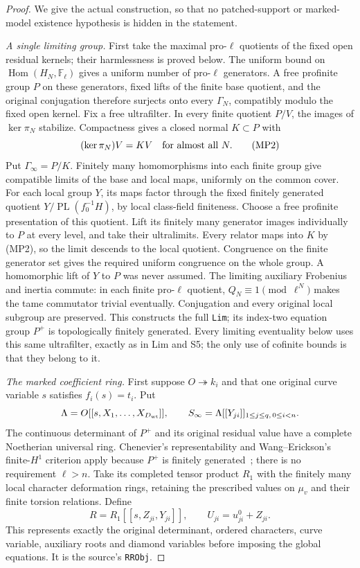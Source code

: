 \begin{proof}
We give the actual construction, so that no patched-support or
marked-model existence hypothesis is hidden in the statement.

\emph{A single limiting group.}
First take the maximal pro-$\ell$ quotients of the fixed open residual
kernels; their harmlessness is proved below.  The uniform bound on
$\operatorname{Hom}(H_N,\mathbb F_\ell)$ gives a uniform number of
pro-$\ell$ generators.  A free profinite group $P$ on these generators,
fixed lifts of the finite base quotient, and the original conjugation
therefore surjects onto every $\Gamma_N$, compatibly modulo the fixed
open kernel.  Fix a free ultrafilter.  In every finite quotient $P/V$,
the images of $\ker\pi_N$ stabilize.  Compactness gives a closed normal
$K\subset P$ with
\[
                    (\ker\pi_N)V=KV
                  \quad\hbox{for almost all }N.             \tag{MP2}
\]
Put $\Gamma_\infty=P/K$.  Finitely many homomorphisms into each finite
group give compatible limits of the base and local maps, uniformly on
the common cover.  For each local group $Y$, its maps factor through the fixed finitely
generated quotient $Y/\operatorname{PL}(f_0^{-1}H)$, by local
class-field finiteness.  Choose a free profinite presentation of this
quotient.  Lift its finitely many generator images individually to $P$
at every level, and take their ultralimits.  Every relator maps into
$K$ by (MP2), so the limit descends to the local quotient.  Congruence
on the finite generator set gives the required uniform congruence on
the whole group.  A homomorphic lift of $Y$ to $P$ was never assumed.
The limiting auxiliary
Frobenius and inertia commute: in each finite pro-$\ell$ quotient,
$Q_N\equiv1\pmod{\ell^N}$ makes the tame commutator trivial eventually.
Conjugation and every original local subgroup are preserved.  This
constructs the full \texttt{Lim}; its index-two equation group $P^+$
is topologically finitely generated.  Every limiting eventuality below
uses this same ultrafilter, exactly as in Lim and S5; the only use of
cofinite bounds is that they belong to it.

\emph{The marked coefficient ring.}
First suppose $O\twoheadrightarrow k_i$ and that one original curve
variable $s$ satisfies $f_i(s)=t_i$.  Put
\[
 \Lambda=O[[s,X_1,\ldots,X_{D_{\rm wt}}]],\qquad
 S_\infty=\Lambda[[Y_{ji}]]_{1\le j\le q,\,0\le i<n}.
\]
The continuous determinant of $P^+$ and its original residual value
have a complete Noetherian universal ring.  Chenevier's representability
and Wang--Erickson's finite-$H^1$ criterion apply because $P^+$ is
finitely generated~\cite{SelmerMarkedChenevier,SelmerMarkedWE};
there is no requirement $\ell>n$.
Take its completed tensor product $R_1$ with the finitely many local
character deformation rings, retaining the prescribed values on
$\mu_v$ and their finite torsion relations.  Define
\[
 R=R_1[[s,Z_{ji},Y_{ji}]],\qquad U_{ji}=u^0_{ji}+Z_{ji}.     \tag{MP3}
\]
This represents exactly the original determinant, ordered characters,
curve variable, auxiliary roots and diamond variables before imposing
the global equations.  It is the source's \texttt{RRObj}.


\end{proof}
